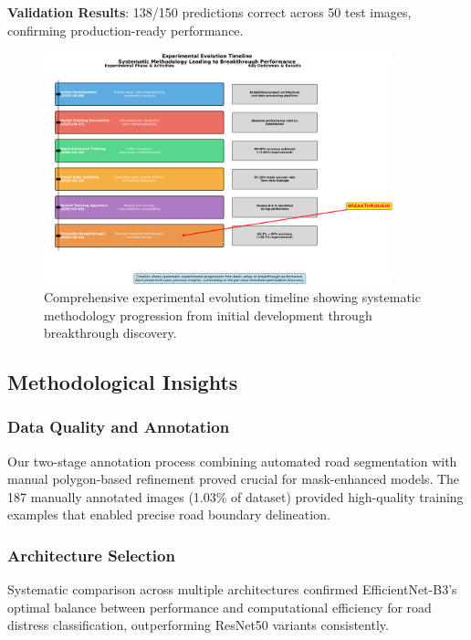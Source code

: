\documentclass[12pt]{article}
\begin{document}
\textbf{Validation Results}: 138/150 predictions correct across 50 test images, confirming production-ready performance.

\begin{figure}[!htb]
\centering
\includegraphics[width=0.9\textwidth]{images/experimental_timeline_detailed.png}
\caption{Comprehensive experimental evolution timeline showing systematic methodology progression from initial development through breakthrough discovery.}
\end{figure}

\subsection{Methodological Insights}

\subsubsection{Data Quality and Annotation}

Our two-stage annotation process combining automated road segmentation with manual polygon-based refinement proved crucial for mask-enhanced models. The 187 manually annotated images (1.03\% of dataset) provided high-quality training examples that enabled precise road boundary delineation.

\subsubsection{Architecture Selection}

Systematic comparison across multiple architectures confirmed EfficientNet-B3's optimal balance between performance and computational efficiency for road distress classification, outperforming ResNet50 variants consistently.
\end{document}
